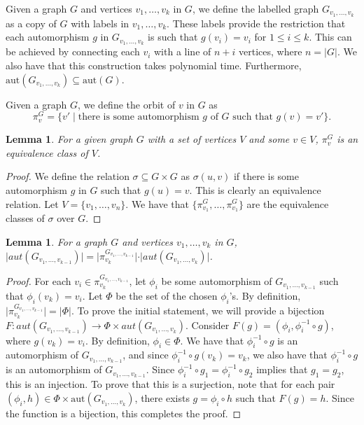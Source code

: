 \documentclass{article}
\def\aut{\mbox{aut}}
\newtheorem{lemma}[theo]{Lemma}
\begin{document}
Given a graph $G$ and vertices $v_1,\ldots,v_k$ in $G$, we define the labelled graph $G_{v_1,\ldots,v_k}$ as a copy of $G$ with labels in $v_1,\ldots,v_k$. These labels provide the restriction that each automorphism $g$ in $G_{v_1,\ldots,v_k}$ is such that $g(v_i) = v_i$ for $1\leq i\leq k$. This can be achieved by connecting each $v_i$ with a line of $n+i$ vertices, where $n = \vert G \vert$. We also have that this construction takes polynomial time. Furthermore, $\aut(G_{v_1,\ldots,v_k})\subseteq\aut(G)$.

Given a graph $G$, we define the orbit of $v$ in $G$ as
\[
\pi_{v}^G = \{v'\mid \mbox{there is some automorphism $g$ of $G$ such that $g(v) = v'$}\}.
\]

\begin{lemma}
	For a given graph $G$ with a set of vertices $V$ and some $v\in V$, $\pi_v^G$ is an equivalence class of $V$.
\end{lemma}
\begin{proof}
	We define the relation $\sigma\subseteq G\times G$ as $\sigma(u,v)$ if there is some automorphism $g$ in $G$ such that $g(u) = v$. This is clearly an equivalence relation. Let $V = \{v_1,\ldots,v_n\}$. We have that $\{\pi_{v_1}^G,\ldots,\pi_{v_1}^G\}$ are the equivalence classes of $\sigma$ over $G$.
\end{proof}

\begin{lemma}\label{induc}
	For a graph $G$ and vertices $v_1,\ldots,v_k$ in $G$, $\vert aut(G_{v_1,\ldots,v_{k-1}}) \vert = \vert \pi_{v_k}^{G_{v_1,\ldots,v_{k-1}}} \vert \cdot \vert aut(G_{v_1,\ldots,v_k}) \vert$.
\end{lemma}
\begin{proof}
	For each $v_i\in\pi^{G_{v_1,\ldots,v_{k-1}}}_{v_k}$, let $\phi_i$ be some automorphism of $G_{v_1,\ldots,v_{k-1}}$ such that $\phi_i(v_k) = v_i$. Let $\Phi$ be the set of the chosen $\phi_i$'s. By definition, $\vert \pi_{v_k}^{G_{v_1,\ldots,v_{k-1}}} \vert = \vert \Phi \vert$. To prove the initial statement, we will provide a bijection $F:aut(G_{v_1,\ldots,v_{k-1}}) \to \Phi\times aut(G_{v_1,\ldots,v_k})$. Consider $F(g) = (\phi_i, \phi_i^{-1}\circ g)$, where $g(v_k) = v_i$. By definition, $\phi_i\in\Phi$. We have that $\phi_i^{-1}\circ g$ is an automorphism of $G_{v_1,\ldots,v_{k-1}}$, and since $\phi_i^{-1}\circ g(v_k) = v_k$, we also have that $\phi_i^{-1}\circ g$ is an automorphism of $G_{v_1,\ldots,v_{k-1}}$. Since $\phi_i^{-1}\circ g_1 = \phi_i^{-1} \circ g_2$ implies that $g_1 = g_2$, this is an injection. To prove that this is a surjection, note that for each pair $(\phi_i,h)\in\Phi\times\aut(G_{v_1,\ldots,v_k})$, there exists $g = \phi_i\circ h$ such that $F(g) = h$. Since the function is a bijection, this completes the proof.
\end{proof}	
\end{document}
